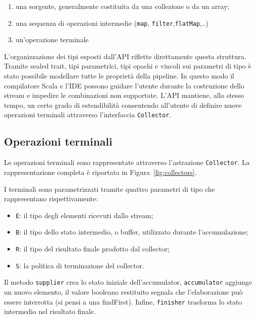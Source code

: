 \documentclass[a4paper,11pt]{report}
\theoremstyle{definition}
\begin{document}
\begin{enumerate}
  \item una sorgente, generalmente costituita da una collezione o da un array;
  \item una sequenza di operazioni intermedie (\texttt{map}, \texttt{filter},\texttt{flatMap},..)
  \item un'operazione terminale
\end{enumerate}

L'organizzazione dei tipi esposti dall'API riflette direttamente questa struttura. Tramite sealed trait, tipi parametrici, tipi opachi e vincoli sui parametri di tipo è stato possibile modellare tutte le proprietà della pipeline. In questo modo il compilatore Scala e l'IDE possono guidare l'utente durante la costruzione dello stream e impedire le combinazioni non supportate.
L'API mantiene, allo stesso tempo, un certo grado di estendibilità consentendo all'utente di definire nuove operazioni terminali attraverso l'interfaccia \texttt{Collector}.

\subsection{Operazioni terminali}

Le operazioni terminali sono rappresentate attraverso l'astrazione \texttt{Collector}. La rappresentazione completa è riportata in Figura~\ref{fig:collectors}.

I terminali sono parametrizzati tramite quattro parametri di tipo che rappresentano rispettivamente:

\begin{itemize}
  \item \texttt{E}: il tipo degli elementi ricevuti dallo stream;
  \item \texttt{B}: il tipo dello stato intermedio, o buffer, utilizzato durante l'accumulazione;
  \item \texttt{R}: il tipo del risultato finale prodotto dal collector;
  \item \texttt{S}: la politica di terminazione del collector.
\end{itemize}

Il metodo \texttt{supplier} crea lo stato iniziale dell'accumulator, \texttt{accumulator} aggiunge un nuovo elemento, il valore booleano restituito segnala che l'elaborazione può essere interrotta (si pensi a una findFirst). Infine, \texttt{finisher} trasforma lo stato intermedio nel risultato finale.
\end{document}
